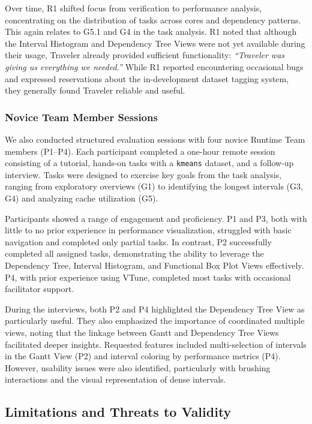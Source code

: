 \begin{refsection}
Over time, R1 shifted focus from verification to performance analysis, concentrating on the distribution of tasks across cores and dependency patterns. This again relates to G5.1 and G4 in the task analysis. R1 noted that although the Interval Histogram and Dependency Tree Views were not yet available during their usage, Traveler already provided sufficient functionality: \emph{``Traveler was giving us everything we needed.''} While R1 reported encountering occasional bugs and expressed reservations about the in-development dataset tagging system, they generally found Traveler reliable and useful.

\subsubsection{Novice Team Member Sessions}

We also conducted structured evaluation sessions with four novice Runtime Team members (P1--P4). Each participant completed a one-hour remote session consisting of a tutorial, hands-on tasks with a \texttt{kmeans} dataset, and a follow-up interview. Tasks were designed to exercise key goals from the task analysis, ranging from exploratory overviews (G1) to identifying the longest intervals (G3, G4) and analyzing cache utilization (G5).

Participants showed a range of engagement and proficiency. P1 and P3, both with little to no prior experience in performance visualization, struggled with basic navigation and completed only partial tasks. In contrast, P2 successfully completed all assigned tasks, demonstrating the ability to leverage the Dependency Tree, Interval Histogram, and Functional Box Plot Views effectively. P4, with prior experience using VTune, completed most tasks with occasional facilitator support.

During the interviews, both P2 and P4 highlighted the Dependency Tree View as particularly useful. They also emphasized the importance of coordinated multiple views, noting that the linkage between Gantt and Dependency Tree Views facilitated deeper insights. Requested features included multi-selection of intervals in the Gantt View (P2) and interval coloring by performance metrics (P4). However, usability issues were also identified, particularly with brushing interactions and the visual representation of dense intervals.

\subsection{Limitations and Threats to Validity}
\label{subsec:limitations}


\end{refsection}
